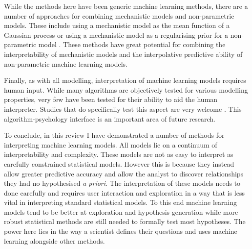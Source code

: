 \documentclass[10pt,]{article}
\begin{document}
While the methods here have been generic machine learning methods, there are a number of approaches for combining mechanistic models and non-parametric models.
These include using a mechanistic model as the mean function of a Gaussian process \citep{rasmussen2004gaussian} or using a mechanistic model as a regularising prior for a non-parametric model \citep{lyddon2018nonparametric}.
These methods have great potential for combining the interpretability of mechanistic models and the interpolative predictive ability of non-parametric machine learning models.

Finally, as with all modelling, interpretation of machine learning models requires human input.
While many algorithms are objectively tested for various modelling properties, very few have been tested for their ability to aid the human interpreter.
Studies that do specifically test this aspect are very welcome \citep{bastani2017interpreting}.
This algorithm-psychology interface is an important area of future research.

To conclude, in this review I have demonstrated  a number of methods for interpreting machine learning models.
All models lie on a continuum of interpretability and complexity.
These models are not as easy to interpret as carefully constrained statistical models.
However this is because they instead allow greater predictive accuracy and allow the analyst to discover relationships they had no hypothesised \emph{a priori}.
The interpretation of these models needs to done carefully and requires user interaction and exploration in a way that is less vital in interpreting standard statistical models.
To this end machine learning models tend to be better at exploration and hypothesis generation while more robust statistical methods are still needed to formally test most hypotheses.
The power here lies in the way a scientist defines their questions and uses machine learning alongside other methods.

 



\end{document}
